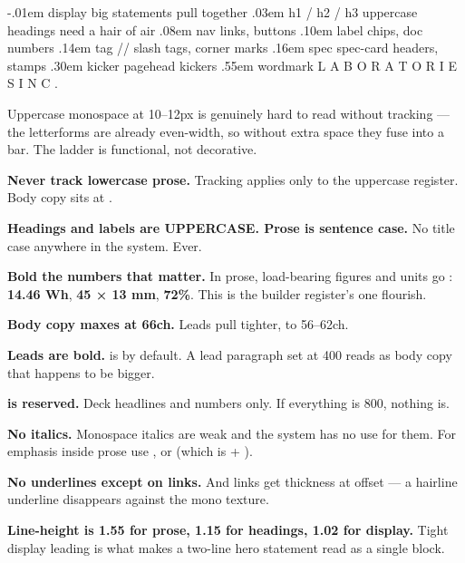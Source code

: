 \documentclass[fontpath=fonts/,logopath=logo/]{riposte-doc}
\begin{document}
\ripcodeopen
{}
\begin{ripcodeblock}
-.01em   display        big statements pull together
 .03em   h1 / h2 / h3   uppercase headings need a hair of air
 .08em   nav            links, buttons
 .10em   label          chips, doc numbers
 .14em   tag            // slash tags, corner marks
 .16em   spec           spec-card headers, stamps
 .30em   kicker         pagehead kickers
 .55em   wordmark       L A B O R A T O R I E S   I N C .
\end{ripcodeblock}
\ripcodesizereset\ripcodeclose

Uppercase monospace at 10–12px is genuinely hard to read without tracking — the letterforms are already even-width, so without extra space they fuse into a bar. The ladder is functional, not decorative.

\textbf{Never track lowercase prose.} Tracking applies only to the uppercase register. Body copy sits at .



\begin{ripnumbers}
\item \textbf{Headings and labels are UPPERCASE. Prose is sentence case.} No title case anywhere in the system. Ever.
\item \textbf{Bold the numbers that matter.} In prose, load-bearing figures and units go : \textbf{14.46 Wh}, \textbf{45 × 13 mm}, \textbf{72\%}. This is the builder register's one flourish.
\item \textbf{Body copy maxes at 66ch.} Leads pull tighter, to 56–62ch.
\item \textbf{Leads are bold.}  is  by default. A lead paragraph set at 400 reads as body copy that happens to be bigger.
\item \textbf{ is reserved.} Deck headlines and  numbers only. If everything is 800, nothing is.
\item \textbf{No italics.} Monospace italics are weak and the system has no use for them. For emphasis inside prose use , or  (which is  + ).
\item \textbf{No underlines except on links.} And links get \ripmono{2px} thickness at \ripmono{3px} offset — a hairline underline disappears against the mono texture.
\item \textbf{Line-height is 1.55 for prose, 1.15 for headings, 1.02 for display.} Tight display leading is what makes a two-line hero statement read as a single block.
\end{ripnumbers}
\end{document}

